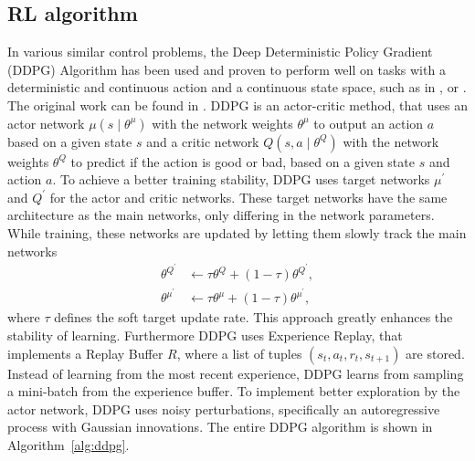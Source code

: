 \documentclass[review]{elsarticle}
\providecommand{\3}{{\ss}}
\begin{document}
	\subsection{\label{RL-algorithm}RL algorithm}
	In various similar control problems, the Deep Deterministic Policy
	Gradient (DDPG) Algorithm has been used and proven to perform well on
	tasks with a deterministic and continuous action and a
	continuous state space, such as in
	\cite{SafeEfficientAndComfortable}, \cite{ComparisonRLvsMPC} or
	\cite{HumanLikeAutonomouCF}. The original work can be found in
	\cite{DDPG}. DDPG is an actor-critic method, that uses an actor network
	$\mu\left(s \mid \theta^{\mu}\right)$ with the network weights $\theta^{\mu} $
	to output an action $a$ based on a given state $s$ and a critic network
	$Q\left(s, a \mid \theta^{Q}\right) $ with the network weights  $\theta^{Q}$ to
	predict if the action is good or bad, based on a given state $s$ and
	action $a$. 
	To achieve a better training stability, DDPG uses target networks  $\mu^{\prime}$ and $Q^{\prime}$ for the actor and critic networks.
	These target networks have the same architecture as the main networks, only differing in the network parameters. While training, these networks are updated by
	letting them slowly track the main networks
	\begin{align}
	\theta^{Q^{\prime}} & \leftarrow \tau \theta^{Q}+(1-\tau) \theta^{Q^{\prime}}, \\
	\theta^{\mu^{\prime}} & \leftarrow \tau \theta^{\mu}+(1-\tau) \theta^{\mu^{\prime}},
	\end{align}
	where $\tau$ defines the soft target update rate.
	This approach greatly enhances the stability of learning.
	Furthermore DDPG uses Experience Replay, that implements a Replay Buffer $R$, where a list of tuples $\left(s_{t}, a_{t}, r_{t}, s_{t+1}\right)$ are stored. Instead of learning from the most recent experience, DDPG learns from sampling a mini-batch from the experience buffer. To implement better exploration by the actor network, DDPG uses noisy perturbations, specifically an autoregressive process with Gaussian innovations. The entire DDPG algorithm is shown in Algorithm~\ref{alg:ddpg}. 
	
\end{document}
